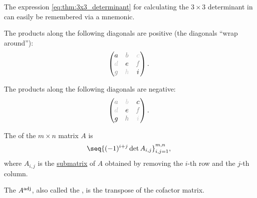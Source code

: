 \begin{remark}\label{rem:3x3_determinant}
  The expression \eqref{eq:thm:3x3_determinant} for calculating the \( 3 \times 3 \) determinant in  can easily be remembered via a mnemonic.

  The products along the following diagonals are positive (the diagonals \enquote{wrap around}):
  \begin{equation*}
    \begin{pmatrix}
      a                   & \color{gray} b      & \color{lightgray} c \\
      \color{lightgray} d & e                   & \color{gray} f      \\
      \color{gray} g      & \color{lightgray} h & i
    \end{pmatrix}.
  \end{equation*}

  The products along the following diagonals are negative:
  \begin{equation*}
    \begin{pmatrix}
      \color{gray} a      & \color{lightgray} b & c                   \\
      \color{lightgray} d & e                   & \color{gray} f      \\
      g                   & \color{gray} h      & \color{lightgray} i
    \end{pmatrix}.
  \end{equation*}
\end{remark}

\begin{definition}\label{def:adjugate_matrix}\mimprovised
  The  of the \( m \times n \) matrix \( A \) is
  \begin{equation*}
    \seq{ (-1)^{i + j} \det A_{i,j} }_{i,j=1}^{m,n},
  \end{equation*}
  where \( A_{i,j} \) is the \hyperref[def:submatrix]{submatrix} of \( A \) obtained by removing the \( i \)-th row and the \( j \)-th column.

  The  \( A^{\op{adj}} \), also called the , is the transpose of the cofactor matrix.
\end{definition}


